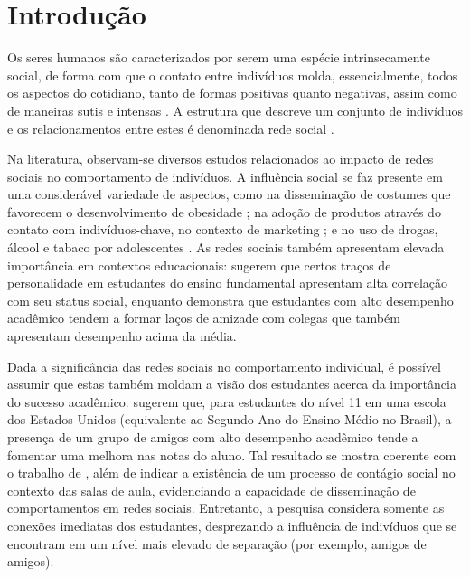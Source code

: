 \chapter{Introdução} \label{sec:intro}

Os seres humanos são caracterizados por serem uma espécie intrinsecamente social, de forma com que o contato entre indivíduos molda, essencialmente, todos os aspectos do cotidiano, tanto de formas positivas quanto negativas, assim como de maneiras sutis e intensas \cite{Christakis2009}. A estrutura que descreve um conjunto de indivíduos e os relacionamentos entre estes é denominada rede social \cite{Wasserman1994}.

Na literatura, observam-se diversos estudos relacionados ao impacto de redes sociais no comportamento de indivíduos. A influência social se faz presente em uma considerável variedade de aspectos, como na disseminação de costumes que favorecem o desenvolvimento de obesidade \cite{Christakis2007}; na adoção de produtos através do contato com indivíduos-chave, no contexto de marketing \cite{Iyengar2011}; e no uso de drogas, álcool e tabaco por adolescentes \cite{Simons-Morton2010}. As redes sociais também apresentam elevada importância em contextos educacionais:  sugerem que certos traços de personalidade em estudantes do ensino fundamental apresentam alta correlação com seu status social, enquanto  demonstra que estudantes com alto desempenho acadêmico tendem a formar laços de amizade com colegas que também apresentam desempenho acima da média.

Dada a significância das redes sociais no comportamento individual, é possível assumir que estas também moldam a visão dos estudantes acerca da importância do sucesso acadêmico.  sugerem que, para estudantes do nível 11 em uma escola dos Estados Unidos (equivalente ao Segundo Ano do Ensino Médio no Brasil), a presença de um grupo de amigos com alto desempenho acadêmico tende a fomentar uma melhora nas notas do aluno. Tal resultado se mostra coerente com o trabalho de , além de indicar a existência de um processo de contágio social no contexto das salas de aula, evidenciando a capacidade de disseminação de comportamentos em redes sociais. Entretanto, a pesquisa considera somente as conexões imediatas dos estudantes, desprezando a influência de indivíduos que se encontram em um nível mais elevado de separação (por exemplo, amigos de amigos).

